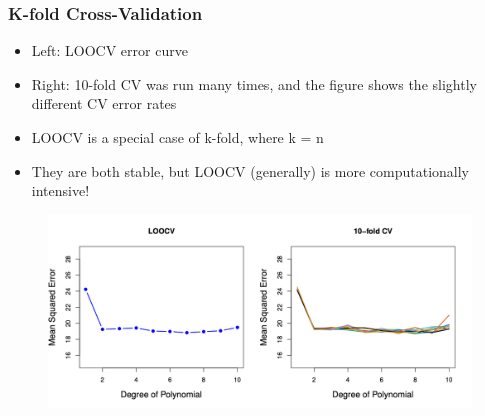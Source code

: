 \documentclass[
  shownotes,
  xcolor={svgnames},
  hyperref={colorlinks,citecolor=DarkBlue,linkcolor=DarkRed,urlcolor=DarkBlue}
  , aspectratio=169]{beamer}
\begin{document}
\begin{frame}[fragile]
\frametitle{K-fold Cross-Validation}
\begin{itemize}
  \scriptsize
\item Left: LOOCV  error curve
\item Right: 10-fold CV was run many times, and the figure shows the slightly different CV error rates
\item LOOCV is a special case of k-fold, where k = n
\item They are both stable, but LOOCV (generally) is more computationally intensive! 
\end{itemize}

        \begin{figure}[H] \centering
            \captionsetup{justification=centering}
              \includegraphics[scale=0.5]{figures/fig54.png}
       \end{figure}
\end{frame}
\end{document}

